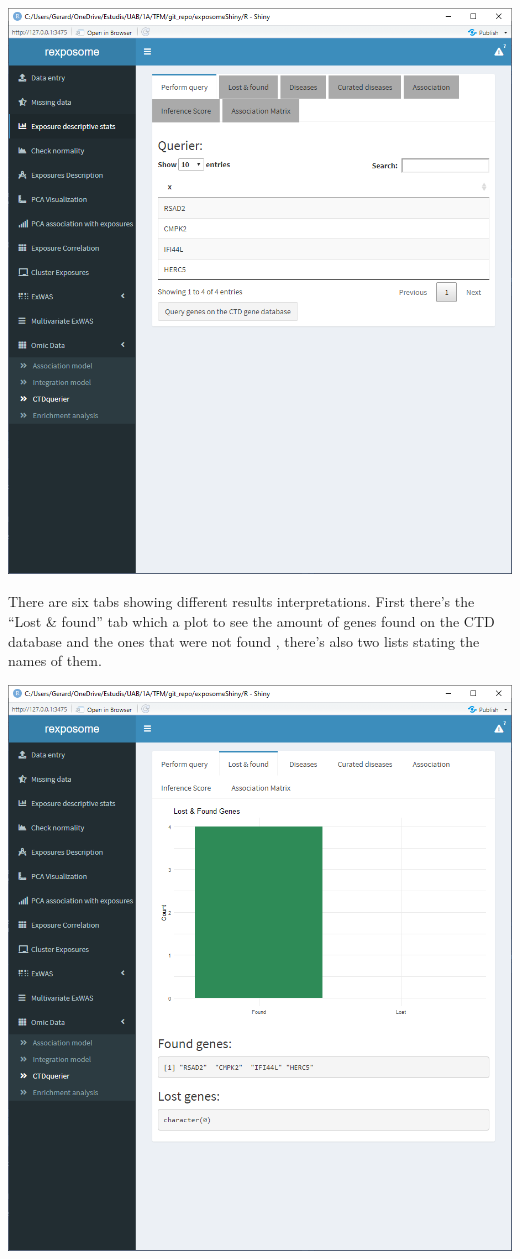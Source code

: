 \documentclass[
]{book}
\begin{document}
\includegraphics{images/analysis10_3.png}

There are six tabs showing different results interpretations. First there's the ``Lost \& found'' tab which a plot to see the amount of genes found on the CTD database and the ones that were not found , there's also two lists stating the names of them.

\includegraphics{images/analysis10_4.png}
\end{document}
